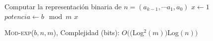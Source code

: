 
  \BlankLine
  Computar la representaci\'on binaria de $n=(a_{k-1},\cdots a_1,a_0)$\;
  $x\gets 1$\;
  $potencia \gets b\mod m$\;
  \Return $x$\;
  \caption{\textsc{Mod-exp}($b,n,m$), Complejidad (bits): $O(($Log$^2(m))$Log$(n))$}